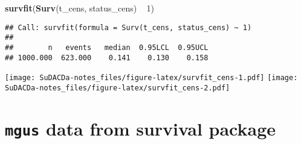 \documentclass[]{book}
\newenvironment{Shaded}{\begin{snugshade}}{\end{snugshade}}
\newcommand{\KeywordTok}[1]{\textcolor[rgb]{0.13,0.29,0.53}{\textbf{{#1}}}}
\newcommand{\DataTypeTok}[1]{\textcolor[rgb]{0.13,0.29,0.53}{{#1}}}
\newcommand{\DecValTok}[1]{\textcolor[rgb]{0.00,0.00,0.81}{{#1}}}
\newcommand{\FloatTok}[1]{\textcolor[rgb]{0.00,0.00,0.81}{{#1}}}
\newcommand{\StringTok}[1]{\textcolor[rgb]{0.31,0.60,0.02}{{#1}}}
\newcommand{\OtherTok}[1]{\textcolor[rgb]{0.56,0.35,0.01}{{#1}}}
\newcommand{\NormalTok}[1]{{#1}}
\theoremstyle{definition}
\theoremstyle{definition}
\theoremstyle{definition}
\theoremstyle{remark}
\begin{document}
\begin{Shaded}
\begin{Highlighting}[]
\KeywordTok{survfit}\NormalTok{(}\KeywordTok{Surv}\NormalTok{(t_cens, status_cens) ~}\StringTok{ }\DecValTok{1}\NormalTok{)}
\end{Highlighting}
\end{Shaded}

\begin{verbatim}
## Call: survfit(formula = Surv(t_cens, status_cens) ~ 1)
## 
##        n   events   median  0.95LCL  0.95UCL 
## 1000.000  623.000    0.141    0.130    0.158
\end{verbatim}

\begin{Shaded}
\end{Shaded}

\texttt{[image: SuDACDa-notes\_files/figure-latex/survfit\_cens-1.pdf]}
\texttt{[image: SuDACDa-notes\_files/figure-latex/survfit\_cens-2.pdf]}

\section{\texorpdfstring{\texttt{mgus} data from \textbf{survival}
package}{mgus data from survival package}}\label{mgus}
\end{document}
